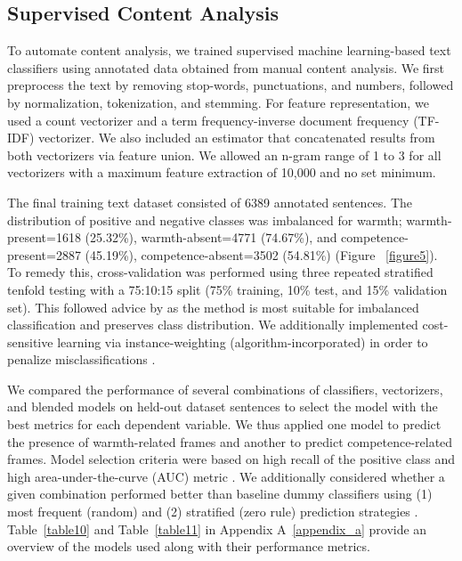 \documentclass[jou]{apa7}
\begin{document}
\subsection{Supervised Content Analysis}
\label{supervised_content_analysis}
To automate content analysis, we trained supervised machine learning-based text classifiers using annotated data obtained from manual content analysis. We first preprocess the text by removing stop-words, punctuations, and numbers, followed by normalization, tokenization, and stemming. For feature representation, we used a count vectorizer and a term frequency-inverse document frequency (TF-IDF) vectorizer. We also included an estimator that concatenated results from both vectorizers via feature union. We allowed an n-gram range of 1 to 3 for all vectorizers with a maximum feature extraction of 10,000 and no set minimum.

The final training text dataset consisted of 6389 annotated sentences. The distribution of positive and negative classes was imbalanced for warmth; warmth-present=1618 (25.32\%), warmth-absent=4771 (74.67\%), and competence-present=2887 (45.19\%), competence-absent=3502 (54.81\%) (Figure ~\ref{figure5}). To remedy this, cross-validation was performed using three repeated stratified tenfold testing with a 75:10:15 split (75\% training, 10\% test, and 15\% validation set). This followed advice by \textcite{vanwinckelenEstimatingModelAccuracy2012} as the method is most suitable for imbalanced classification and preserves class distribution. We additionally implemented cost-sensitive learning via instance-weighting (algorithm-incorporated) in order to penalize misclassifications \parencite{thai-ngheCostsensitiveLearningMethods2010}.

We compared the performance of several combinations of classifiers, vectorizers, and blended models on held-out dataset sentences to select the model with the best metrics for each dependent variable. We thus applied one model to predict the presence of warmth-related frames and another to predict competence-related frames. Model selection criteria were based on high recall of the positive class and high area-under-the-curve (AUC) metric \parencite{burscherTeachingComputerCode2014}. We additionally considered whether a given combination performed better than baseline dummy classifiers using (1) most frequent (random) and (2) stratified (zero rule) prediction strategies \parencite{choudharyComprehensiveReviewSupervised2017}. Table~\ref{table10} and Table~\ref{table11} in Appendix A~\ref{appendix_a} provide an overview of the models used along with their performance metrics.
\end{document}
